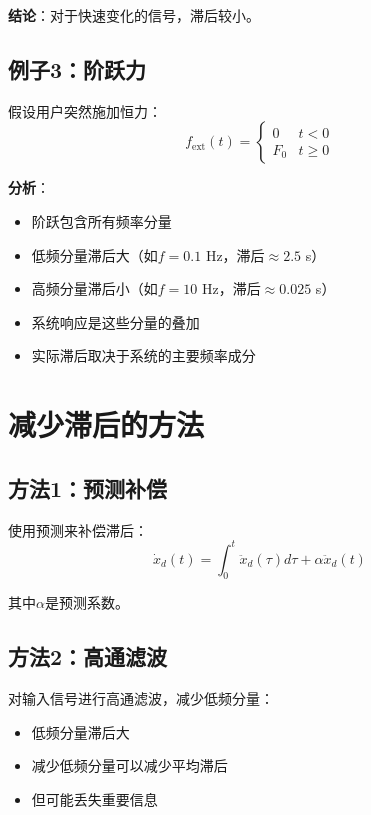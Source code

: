 \documentclass[12pt,a4paper]{article}
\begin{document}
\textbf{结论}：对于快速变化的信号，滞后较小。

\subsection{例子3：阶跃力}

假设用户突然施加恒力：
\begin{equation}
f_{\text{ext}}(t) = \begin{cases}
0 & t < 0 \\
F_0 & t \geq 0
\end{cases}
\end{equation}

\textbf{分析}：
\begin{itemize}
\item 阶跃包含所有频率分量
\item 低频分量滞后大（如$f = 0.1$ Hz，滞后$\approx 2.5$ s）
\item 高频分量滞后小（如$f = 10$ Hz，滞后$\approx 0.025$ s）
\item 系统响应是这些分量的叠加
\item 实际滞后取决于系统的主要频率成分
\end{itemize}

\section{减少滞后的方法}

\subsection{方法1：预测补偿}

使用预测来补偿滞后：
\begin{equation}
\dot{x}_d(t) = \int_0^t \ddot{x}_d(\tau) d\tau + \alpha \ddot{x}_d(t)
\end{equation}

其中$\alpha$是预测系数。

\subsection{方法2：高通滤波}

对输入信号进行高通滤波，减少低频分量：
\begin{itemize}
\item 低频分量滞后大
\item 减少低频分量可以减少平均滞后
\item 但可能丢失重要信息
\end{itemize}
\end{document}
